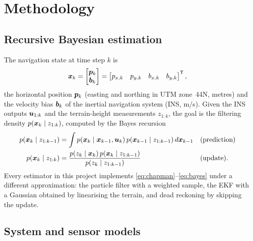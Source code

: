 \section{Methodology}\label{sec:method}

\subsection{Recursive Bayesian estimation}
The navigation state at time step $k$ is
\begin{equation}
  \bm{x}_k = \begin{bmatrix} \bm{p}_k \\ \bm{b}_k \end{bmatrix}
       = \begin{bmatrix} p_{x,k} & p_{y,k} & b_{x,k} & b_{y,k} \end{bmatrix}^{\mathsf{T}},
\end{equation}
the horizontal position $\bm{p}_k$ (easting and northing in UTM zone~44N, metres) and the
velocity bias $\bm{b}_k$ of the inertial navigation system (INS, m/s). Given the INS
outputs $\bm{u}_{1:k}$ and the terrain-height measurements $z_{1:k}$, the goal is the filtering
density $p(\bm{x}_k \mid z_{1:k})$, computed by the Bayes recursion~\cite{arulampalam2002,sarkka2023,thrun2005}
\begin{align}
  p(\bm{x}_k \mid z_{1:k-1}) &= \int p(\bm{x}_k \mid \bm{x}_{k-1}, \bm{u}_k)\,
                            p(\bm{x}_{k-1} \mid z_{1:k-1})\, d\bm{x}_{k-1}
                            && \text{(prediction)} \label{eq:chapman}\\
  p(\bm{x}_k \mid z_{1:k}) &= \frac{p(z_k \mid \bm{x}_k)\, p(\bm{x}_k \mid z_{1:k-1})}
                               {p(z_k \mid z_{1:k-1})}
                            && \text{(update)}. \label{eq:bayes}
\end{align}
Every estimator in this project implements \eqref{eq:chapman}--\eqref{eq:bayes} under a
different approximation: the particle filter with a weighted sample, the EKF with a Gaussian
obtained by linearising the terrain, and dead reckoning by skipping the update.

\subsection{System and sensor models}\label{sec:models}

